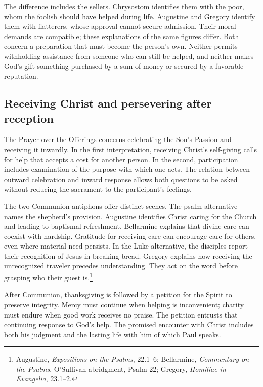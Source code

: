 The difference includes the sellers. Chrysostom identifies them with the poor, whom the foolish should have helped during life. Augustine and Gregory identify them with flatterers, whose approval cannot secure admission. Their moral demands are compatible; these explanations of the same figures differ. Both concern a preparation that must become the person's own. Neither permits withholding assistance from someone who can still be helped, and neither makes God's gift something purchased by a sum of money or secured by a favorable reputation.

\subsection{Receiving Christ and persevering after reception}
The Prayer over the Offerings concerns celebrating the Son's Passion and receiving it inwardly. In the first interpretation, receiving Christ's self-giving calls for help that accepts a cost for another person. In the second, participation includes examination of the purpose with which one acts. The relation between outward celebration and inward response allows both questions to be asked without reducing the sacrament to the participant's feelings.

The two Communion antiphons offer distinct scenes. The psalm alternative names the shepherd's provision. Augustine identifies Christ caring for the Church and leading to baptismal refreshment. Bellarmine explains that divine care can coexist with hardship. Gratitude for receiving care can encourage care for others, even where material need persists. In the Luke alternative, the disciples report their recognition of Jesus in breaking bread. Gregory explains how receiving the unrecognized traveler precedes understanding. They act on the word before grasping who their guest is.\footnote{Augustine, \textit{Expositions on the Psalms}, 22.1--6; Bellarmine, \textit{Commentary on the Psalms}, O'Sullivan abridgment, Psalm 22; Gregory, \textit{Homiliae in Evangelia}, 23.1--2.}

After Communion, thanksgiving is followed by a petition for the Spirit to preserve integrity. Mercy must continue when helping is inconvenient; charity must endure when good work receives no praise. The petition entrusts that continuing response to God's help. The promised encounter with Christ includes both his judgment and the lasting life with him of which Paul speaks.
\clearpage
